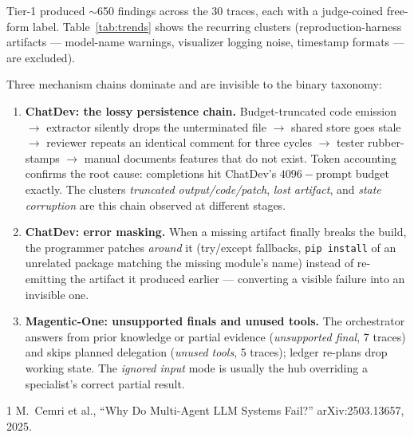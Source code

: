 \documentclass[11pt]{article}
\begin{document}
Tier-1 produced $\sim$650 findings across the 30 traces, each with a
judge-coined free-form label. Table~\ref{tab:trends} shows the recurring
clusters (reproduction-harness artifacts --- model-name warnings, visualizer
logging noise, timestamp formats --- are excluded).



Three mechanism chains dominate and are invisible to the binary taxonomy:

\begin{enumerate}
\item \textbf{ChatDev: the lossy persistence chain.} Budget-truncated code
emission $\rightarrow$ extractor silently drops the unterminated file
$\rightarrow$ shared store goes stale $\rightarrow$ reviewer repeats an
identical comment for three cycles $\rightarrow$ tester rubber-stamps
$\rightarrow$ manual documents features that do not exist. Token accounting
confirms the root cause: completions hit ChatDev's $4096-\mathrm{prompt}$
budget exactly. The clusters \emph{truncated output/code/patch},
\emph{lost artifact}, and \emph{state corruption} are this chain observed at
different stages.
\item \textbf{ChatDev: error masking.} When a missing artifact finally
breaks the build, the programmer patches \emph{around} it (try/except
fallbacks, \texttt{pip install} of an unrelated package matching the missing
module's name) instead of re-emitting the artifact it produced earlier ---
converting a visible failure into an invisible one.
\item \textbf{Magentic-One: unsupported finals and unused tools.} The
orchestrator answers from prior knowledge or partial evidence
(\emph{unsupported final}, 7 traces) and skips planned delegation
(\emph{unused tools}, 5 traces); ledger re-plans drop working state. The
\emph{ignored input} mode is usually the hub overriding a specialist's
correct partial result.
\end{enumerate}

\appendix


\begin{thebibliography}{1}
 M.~Cemri et al., ``Why Do Multi-Agent LLM Systems Fail?''
arXiv:2503.13657, 2025.
\end{thebibliography}
\end{document}
